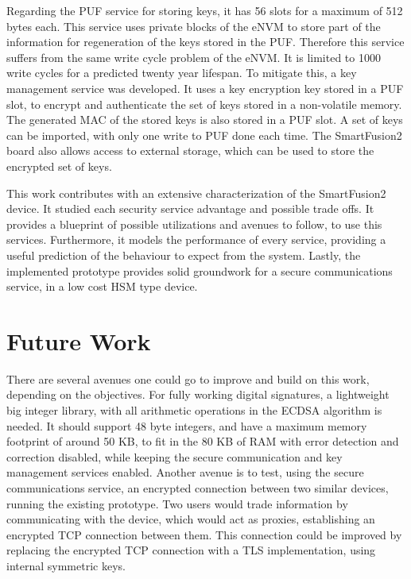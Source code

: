 Regarding the PUF service for storing keys, it has 56 slots for a maximum of 512 bytes each. This service uses private blocks of the eNVM to store part of the information for regeneration of the keys stored in the PUF. Therefore this service suffers from the same write cycle problem of the eNVM. It is limited to 1000 write cycles for a predicted twenty year lifespan. To mitigate this, a key management service was developed. It uses a key encryption key stored in a PUF slot, to encrypt and authenticate the set of keys stored in a non-volatile memory. The generated MAC of the stored keys is also stored in a PUF slot. A set of keys can be imported, with only one write to PUF done each time. The SmartFusion2 board also allows access to external storage, which can be used to store the encrypted set of keys.

This work contributes with an extensive characterization of the SmartFusion2 device. It studied each security service advantage and possible trade offs. It provides a blueprint of possible utilizations and avenues to follow, to use this services. Furthermore, it models the performance of every service, providing a useful prediction of the behaviour to expect from the system. Lastly, the implemented prototype provides solid groundwork for a secure communications service, in a low cost HSM type device.

\section{Future Work} \label{chap:conclusion:future-work}

There are several avenues one could go to improve and build on this work, depending on the objectives. For fully working digital signatures, a lightweight big integer library, with all arithmetic operations in the \ac{ECDSA} algorithm is needed. It should support 48 byte integers, and have a maximum memory footprint of around 50 KB, to fit in the 80 KB of RAM with error detection and correction disabled, while keeping the secure communication and key management services enabled.
Another avenue is to test, using the secure communications service, an encrypted connection between two similar devices, running the existing prototype. Two users would trade information by communicating with the device, which would act as proxies, establishing an encrypted TCP connection between them. This connection could be improved by replacing the encrypted TCP connection with a TLS implementation, using internal symmetric keys.
